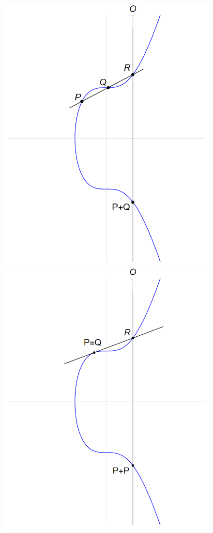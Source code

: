 \documentclass[../../tesis_maestria]{subfiles}
\begin{document}
\begin{figure}
\begin{minipage}[t]{0.3\textwidth}
	\includegraphics[width=\textwidth]{figuras/suma_eliptica_1}
\end{minipage}
\begin{minipage}[t]{0.3\textwidth}
	\includegraphics[width=\textwidth]{figuras/suma_eliptica_2}

\end{minipage}
\end{figure}
\end{document}
